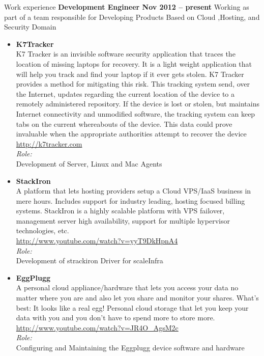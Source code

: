 \documentclass{resume}
\begin{document}
\begin{category}{Work experience}
  \citemnobullet \textbf{{Development Engineer} \hfill Nov 2012 -- present}
  \citemnobullet Working as part of a team responsible for Developing Products Based on Cloud ,Hosting, and Security Domain
  \begin{itemize}

  \item {{\bfseries K7Tracker} \\
  K7 Tracker is an invisible software security application that traces the location of missing
  laptops for recovery. It is a light weight application that will help you track and find your
  laptop if it ever gets stolen. K7 Tracker provides a method for mitigating this risk. This
  tracking system send, over the Internet, updates regarding the current location of the device
  to a remotely administered repository. If the device is lost or stolen, but maintains Internet
  connectivity and unmodified software, the tracking system can keep tabs on the current
  whereabouts of the device. This data could prove invaluable when the appropriate authorities attempt to recover the device\\
  \url{http://k7tracker.com}\\
  {\it Role:}\\
  Development of Server, Linux and Mac Agents\\
  }

  \item {{\bfseries StackIron} \\
  A platform that lets hosting providers setup a Cloud VPS/IaaS business in mere hours. 
  Includes support for industry leading, hosting focused billing systems. 
  StackIron is a highly scalable platform with VPS failover, management server high availability,
  support for multiple hypervisor technologies, etc.\\
  \url{http://www.youtube.com/watch?v=yyT9DkHpnA4}\\
  {\it Role:}\\
  Development of strackiron Driver for scaleInfra\\
  } 

  \item{{\bfseries EggPlugg} \\
  A personal cloud appliance/hardware that lets you access your data no matter where you 
  are and also let you share and monitor your shares. What's best: It looks like a real egg! 
  Personal cloud storage that let you keep your data with you and you don't have to spend more to store more. 
  \url{http://www.youtube.com/watch?v=JR4O_AgsM2c}\\
  {\it Role:}\\
  Configuring and Maintaining the Eggplugg device software and hardware\\
  }


\end{itemize}
\end{category}
\end{document}
